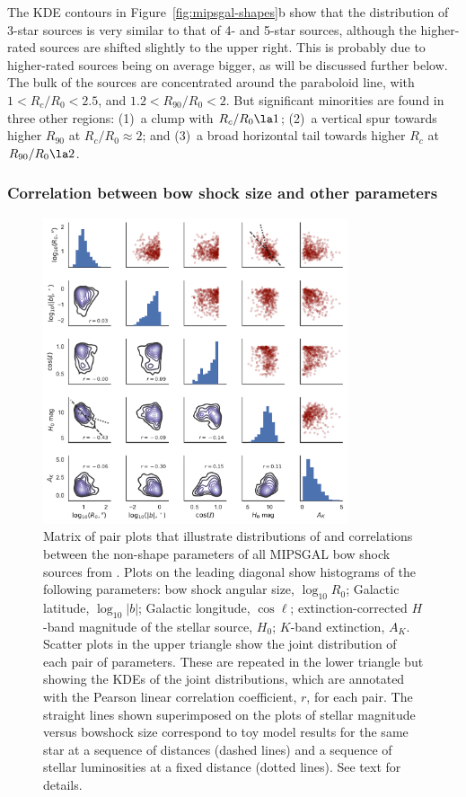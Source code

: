 The KDE contours in Figure~\ref{fig:mipsgal-shapes}b show that the
distribution of 3-star sources is very similar to that of 4- and
5-star sources, although the higher-rated sources are shifted slightly
to the upper right.  This is probably due to higher-rated sources
being on average bigger, as will be discussed further below.  The bulk
of the sources are concentrated around the paraboloid line, with
\(1 < R_c/R_0 < 2.5\), and \(1.2 < R_{90}/R_0 < 2\).  But significant
minorities are found in three other regions: (1)~a clump with
\(R_c/R_0 \la 1\); (2)~a vertical spur towards higher \(R_{90}\) at
\(R_c/R_0 \approx 2\); and (3)~a broad horizontal tail towards higher
\(R_c\) at \(R_{90}/R_0 \la 2\).


\subsubsection{Correlation between bow shock size and other parameters}
\label{sec:corr-size}

\begin{figure}
  \centering
  \includegraphics[width=0.8\textwidth]{figs/mipsgal-pairplot}
  \caption[]{Matrix of pair plots that illustrate distributions of and
    correlations between the non-shape parameters of all MIPSGAL bow
    shock sources from \citet{Kobulnicky:2016a}.  Plots on the leading
    diagonal show histograms of the following parameters: bow shock
    angular size, \(\log_{10} R_0\); Galactic latitude,
    \(\log_{10}|b|\); Galactic longitude, \(\cos \ell\);
    extinction-corrected \(H\)-band magnitude of the stellar source,
    \(H_0\); \(K\)-band extinction, \(A_K\).  Scatter plots in the
    upper triangle show the joint distribution of each pair of
    parameters.  These are repeated in the lower triangle but showing
    the KDEs of the joint distributions, which are annotated with the
    Pearson linear correlation coefficient, \(r\), for each pair. The
    straight lines shown superimposed on the plots of stellar magnitude
    versus bowshock size correspond to toy model results for the same star
    at a sequence of distances (dashed lines) and a sequence of
    stellar luminosities at a fixed distance (dotted lines).  See text
    for details. }
  \label{fig:mipsgal-pairplot}
\end{figure}

